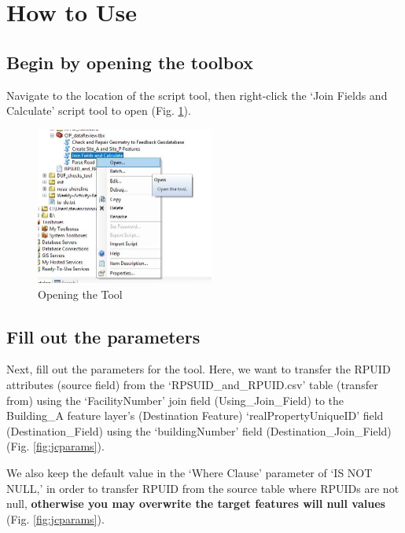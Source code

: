 \documentclass[openany]{book}
\theoremstyle{definition}
\theoremstyle{definition}
\theoremstyle{definition}
\theoremstyle{remark}
\begin{document}
\section{How to Use}\label{how-to-use-1}

\subsection{Begin by opening the
toolbox}\label{begin-by-opening-the-toolbox-1}

Navigate to the location of the script tool, then right-click the `Join
Fields and Calculate' script tool to open (Fig. \ref{fig:jcopen}).

\begin{figure}[H]

{\centering \includegraphics[width=2.3in,]{figures/joinCalcopentool} 

}

\caption{Opening the Tool}\label{fig:jcopen}
\end{figure}

\subsection{Fill out the parameters}\label{fill-out-the-parameters-1}

Next, fill out the parameters for the tool. Here, we want to transfer
the RPUID attributes (source field) from the `RPSUID\_and\_RPUID.csv'
table (transfer from) using the `FacilityNumber' join field
(Using\_Join\_Field) to the Building\_A feature layer's (Destination
Feature) `realPropertyUniqueID' field (Destination\_Field) using the
`buildingNumber' field (Destination\_Join\_Field) (Fig.
\ref{fig:jcparams}).

We also keep the default value in the `Where Clause' parameter of `IS
NOT NULL,' in order to transfer RPUID from the source table where RPUIDs
are not null, \textbf{otherwise you may overwrite the target features
will null values} (Fig. \ref{fig:jcparams}).
\end{document}

